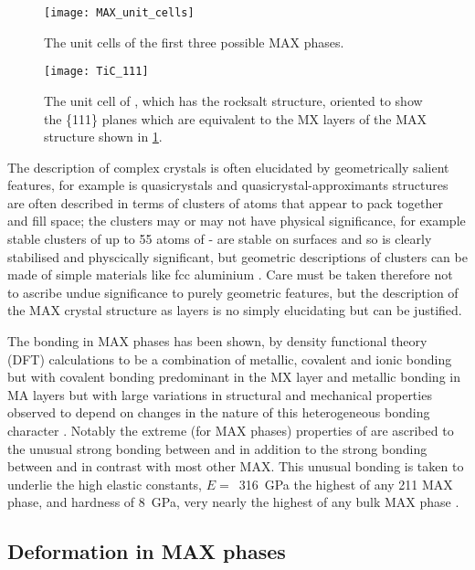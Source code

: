 \begin{figure}
\centering
\texttt{[image: MAX\_unit\_cells]}
\caption{The unit cells of the first three possible MAX phases.\label{fig:MAX_unit_cells}}
\end{figure}




\begin{figure}
\centering
\texttt{[image: TiC\_111]}
\caption{The unit cell of , which has the rocksalt structure, oriented to show the \{111\} planes which are equivalent to the MX layers of the MAX structure shown in \ref{fig:MAX_unit_cells}. \label{fig:TiC_111}}
\end{figure}


The description of complex crystals is often elucidated by geometrically salient features, for example is quasicrystals and quasicrystal-approximants structures are often described in terms of clusters of atoms that appear to pack together and fill space; the clusters may or may not have physical significance, for example stable clusters of up to 55 atoms of - are stable on surfaces and so is clearly stabilised and physcically significant, but geometric descriptions of clusters can be made of simple materials like fcc aluminium \cite{Steurer2006}. Care must be taken therefore not to ascribe undue significance to purely geometric features, but the description of the MAX crystal structure as layers is no simply elucidating but can be justified.

The bonding in MAX phases has been shown, by density functional theory (DFT) calculations to be a combination of metallic, covalent and ionic bonding but with covalent bonding predominant in the MX layer and metallic bonding in MA layers but with large variations in structural and mechanical properties observed to depend on changes in the nature of this heterogeneous bonding character \cite{Radovic2013,Sun2011}. Notably the extreme (for MAX phases) properties of  are ascribed to the unusual strong bonding between  and  in addition to the strong bonding between  and  in contrast with most other MAX. This unusual bonding is taken to underlie the high elastic constants, $E =$~\SI{316}{\giga\pascal} the highest of any 211 MAX phase, and hardness of \SI{8}{\giga\pascal}, very nearly the highest of any bulk MAX phase \cite{Feng2010,Sun2011}.

\subsection{Deformation in MAX phases}


